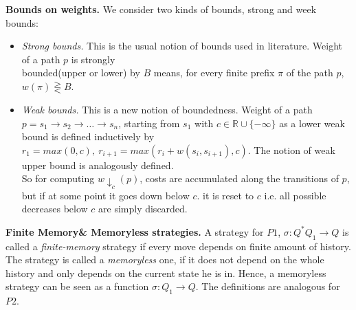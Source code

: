 \textbf{Bounds on weights.} We consider two kinds of bounds, strong and week bounds:
\begin{itemize}
	\item \textit{Strong bounds.} This is the usual notion of bounds used in literature. Weight of a path $p$ is strongly\\
	 bounded(upper or lower) by $B$ means, for every finite prefix $\pi$ of the path $p$, $w(\pi) \gtreqless B$.

	\item \textit{Weak bounds.} This is a new notion of boundedness. Weight of a path $p= s_1 \rightarrow s_2 \rightarrow \ldots \rightarrow s_n$, starting from $s_1$ with $c \in \mathbb{R} \cup \{- \infty \}$ as a lower weak bound is defined inductively by $r_1 = max(0, c),\  r_{i+1} = max(r_i + w(s_i, s_{i+1}), c)$. The notion of weak upper bound is analogously defined.\\

	So for computing $w\downarrow_{c}(p)$, costs are accumulated along the transitions of $p$, but if at some point it goes down below $c$. it is reset to $c$ i.e. all possible decreases below $c$ are simply discarded.
\end{itemize}
\vskip 0.6cm

\textbf{Finite Memory\& Memoryless strategies.} A strategy for $P1$, $\sigma : Q^{*} Q_1 \rightarrow Q$ is called a \textit{finite-memory} strategy if every move depends on finite amount of history. The strategy is called a \textit{memoryless} one, if it does not depend on the whole history and only depends on the current state he is in. Hence, a memoryless strategy can be seen as a function $\sigma:Q_1 \rightarrow Q$. The definitions are analogous for $P2$.
\vskip 0.6cm

